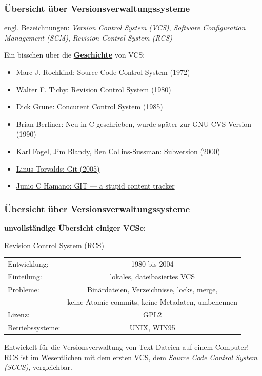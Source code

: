 \documentclass{beamer}
\begin{document}
\begin{frame}\frametitle{Übersicht über Versionsverwaltungssysteme} 
engl. Bezeichnungen: \textit{Version Control System (VCS)}, \textit{Software Configuration Management (SCM)}, \textit{Revision Control System (RCS)}
\vspace*{0.15cm}

Ein bisschen über die \textbf{\href{http://doi.acm.org/10.1145/1668862.1668876}{Geschichte}} von VCS: 
\begin{itemize}
\item \href{http://www.basepath.com/aup/talks/SCCS-Slideshow.pdf}{Marc J. Rochkind: Source Code Control System (1972)} 
\item \href{http://dl.acm.org/citation.cfm?id=807748}{Walter F. Tichy: Revision Control System (1980)}
\item \href{http://www.grosskurth.ca/bib/1986/grune.pdf}{Dick Grune: Concurent Control System (1985)}
\item Brian Berliner: Neu in C geschrieben, wurde später zur GNU CVS Version (1990)
\item Karl Fogel, Jim Blandy, \href{http://dl.acm.org/citation.cfm?id=513039.513042}{Ben Collins-Sussman}: Subversion (2000) 
\item \href{http://marc.info/?l=linux-kernel&m=111280216717070}{Linus Torvalds: Git (2005)}
\item \href{http://download.hforge.org/doc/git-resources/200607-ols.pdf}{Junio C Hamano: GIT — a stupid content tracker}

\end{itemize}

\end{frame}
\begin{frame}\frametitle{Übersicht über Versionsverwaltungssysteme} 
\textbf{unvollständige Übersicht einiger VCSe:}
\begin{block}{Revision Control System (RCS)}
	\begin{tabular}{l c}
Entwicklung: & 1980 bis 2004  \\  
Einteilung: & lokales, dateibasiertes VCS \\ 
Probleme: & Binärdateien, Verzeichnisse, locks, merge, \\
          & keine Atomic commits, keine Metadaten, umbenennen  \\
Lizenz: & GPL2 \\
Betriebssysteme: & UNIX, WIN95 \\

\end{tabular} 

\vspace*{0.3cm}
Entwickelt für die Versionsverwaltung von Text-Dateien auf einem Computer!
RCS ist im Wesentlichen mit dem ersten VCS, dem \textit{Source Code Control System (SCCS)}, vergleichbar.
\end{block}
\end{frame}
\end{document}
